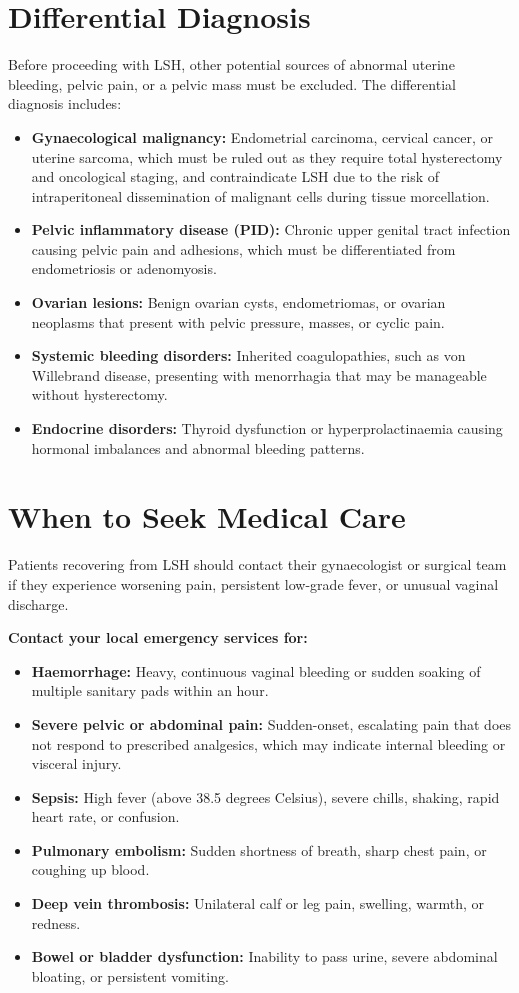 \section*{Differential Diagnosis}
Before proceeding with LSH, other potential sources of abnormal uterine bleeding, pelvic pain, or a pelvic mass must be excluded. The differential diagnosis includes:
\begin{itemize}
    \item \textbf{Gynaecological malignancy:} Endometrial carcinoma, cervical cancer, or uterine sarcoma, which must be ruled out as they require total hysterectomy and oncological staging, and contraindicate LSH due to the risk of intraperitoneal dissemination of malignant cells during tissue morcellation.
    \item \textbf{Pelvic inflammatory disease (PID):} Chronic upper genital tract infection causing pelvic pain and adhesions, which must be differentiated from endometriosis or adenomyosis.
    \item \textbf{Ovarian lesions:} Benign ovarian cysts, endometriomas, or ovarian neoplasms that present with pelvic pressure, masses, or cyclic pain.
    \item \textbf{Systemic bleeding disorders:} Inherited coagulopathies, such as von Willebrand disease, presenting with menorrhagia that may be manageable without hysterectomy.
    \item \textbf{Endocrine disorders:} Thyroid dysfunction or hyperprolactinaemia causing hormonal imbalances and abnormal bleeding patterns.
\end{itemize}

\section*{When to Seek Medical Care}
Patients recovering from LSH should contact their gynaecologist or surgical team if they experience worsening pain, persistent low-grade fever, or unusual vaginal discharge.

\textbf{Contact your local emergency services for:}
\begin{itemize}
    \item \textbf{Haemorrhage:} Heavy, continuous vaginal bleeding or sudden soaking of multiple sanitary pads within an hour.
    \item \textbf{Severe pelvic or abdominal pain:} Sudden-onset, escalating pain that does not respond to prescribed analgesics, which may indicate internal bleeding or visceral injury.
    \item \textbf{Sepsis:} High fever (above 38.5 degrees Celsius), severe chills, shaking, rapid heart rate, or confusion.
    \item \textbf{Pulmonary embolism:} Sudden shortness of breath, sharp chest pain, or coughing up blood.
    \item \textbf{Deep vein thrombosis:} Unilateral calf or leg pain, swelling, warmth, or redness.
    \item \textbf{Bowel or bladder dysfunction:} Inability to pass urine, severe abdominal bloating, or persistent vomiting.
\end{itemize}


